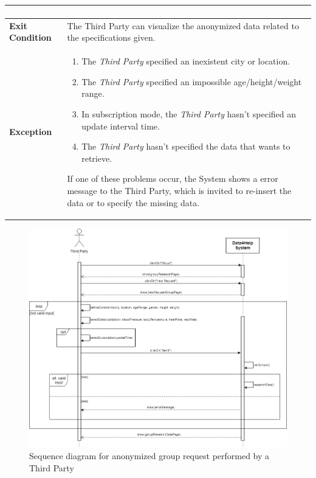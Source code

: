\begin{table}[H]
\begin{tabular}{|p{3.5cm}|p{10.3cm}|}
\begin{enumerate}[leftmargin=0.5cm]
                                          \end{enumerate}
    										\\
    \hline
    \textbf{\large{Exit Condition}} 	& The Third Party can visualize the                                         anonymized data related to the specifications given. \\
    
    \hline
    \textbf{\large{Exception}} 			& \begin{enumerate}[leftmargin=0.5cm]                                           \item The \emph{Third Party}                                            specified an inexistent city or                                             location.
                                            \item The \emph{Third Party} specified an impossible age/height/weight range.
                                            \item In subscription mode, the \emph{Third Party} hasn't specified an update interval time.
                                            \item The \emph{Third Party} hasn't specified the data that wants to retrieve.
    \end{enumerate}
    										If one of these problems occur, the System shows a error message to the Third Party, which is invited to re-insert the data or to specify the missing data. \\
    
    \hline
    
    \end{tabular}
	
\end{table}
\begin{figure}[H]
    \centering
    \includegraphics[scale=0.4]{./Pictures/groupResearchSeqDiag.png}
    \caption{Sequence diagram for anonymized group request performed by a Third Party}
    
\end{figure}
